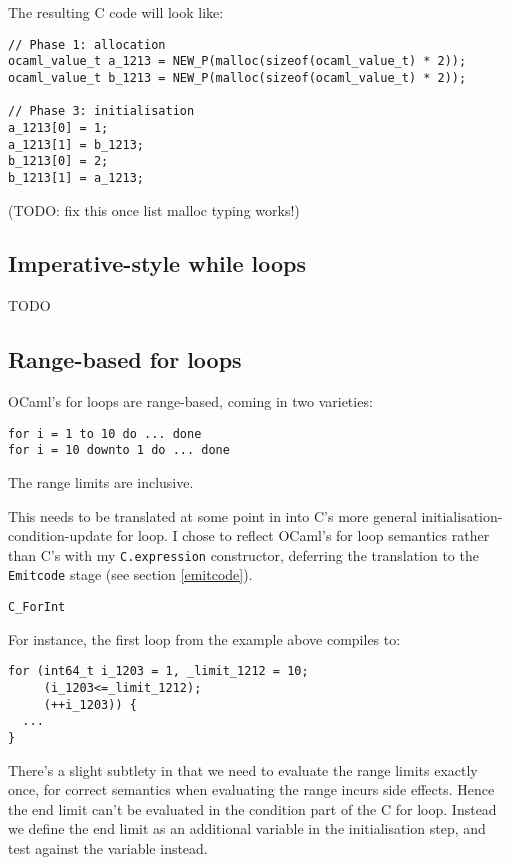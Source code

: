 \documentclass[12pt,a4paper,twoside,openright]{report}
\begin{document}
The resulting C code will look like:

\begin{lstlisting}
// Phase 1: allocation
ocaml_value_t a_1213 = NEW_P(malloc(sizeof(ocaml_value_t) * 2));
ocaml_value_t b_1213 = NEW_P(malloc(sizeof(ocaml_value_t) * 2));

// Phase 3: initialisation
a_1213[0] = 1;
a_1213[1] = b_1213;
b_1213[0] = 2;
b_1213[1] = a_1213;
\end{lstlisting}
(TODO: fix this once list malloc typing works!)

\subsection{Imperative-style while loops}\label{while-loops}

TODO

\subsection{Range-based for loops}\label{for-loops}

OCaml's for loops are range-based, coming in two varieties:
\begin{lstlisting}
for i = 1 to 10 do ... done
for i = 10 downto 1 do ... done
\end{lstlisting}

The range limits are inclusive.

This needs to be translated at some point in into C's more general
initialisation-condition-update for loop. I chose to reflect OCaml's for loop
semantics rather than C's with my \lstinline!C.expression!
constructor, deferring the translation to the \lstinline!Emitcode! stage (see
section \ref{emitcode}).

\lstinline!C_ForInt!

For instance, the first loop from the example above
compiles to:

\begin{lstlisting}
for (int64_t i_1203 = 1, _limit_1212 = 10;
     (i_1203<=_limit_1212);
     (++i_1203)) {
  ...
}
\end{lstlisting}

There's a slight subtlety in that we need to evaluate the range limits exactly
once, for correct semantics when evaluating the range incurs side effects.
Hence the end limit can't be evaluated in the condition part of the C for loop.
Instead we define the end limit as an additional variable in the initialisation
step, and test against the variable instead.
\end{document}
